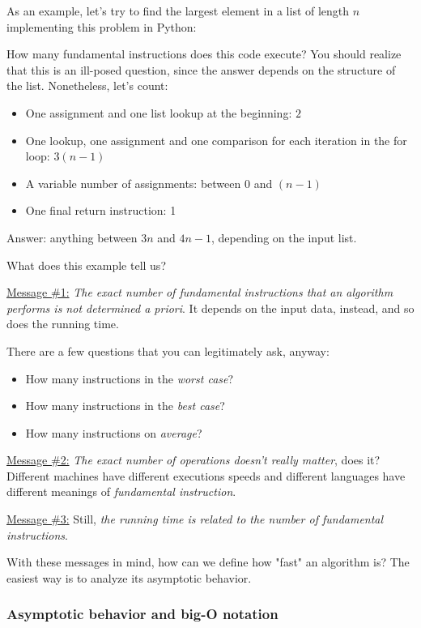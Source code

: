 As an example, let's try to find the largest element in a list of length $n$ implementing this problem in Python:



How many fundamental instructions does this code execute? You should realize that this is an ill-posed question, since the answer depends on the structure of the list. Nonetheless, let's count:
\begin{itemize}
    \item[-] One assignment and one list lookup at the beginning: $2$
    \item[-] One lookup, one assignment and one comparison for each iteration in the for loop: $3(n - 1)$
    \item[-] A variable number of assignments: between $0$ and $(n - 1)$
    \item[-] One final return instruction: 1
\end{itemize}
Answer: anything between $3n$ and $4n - 1$, depending on the input list.

What does this example tell us?

\underline{Message \#1:} \textit{The exact number of fundamental instructions that an algorithm performs is not determined a priori}. It depends on the input data, instead, and so does the running time.

There are a few questions that you can legitimately ask, anyway:
\begin{itemize}
    \item[-] How many instructions in the \textit{worst case}?
    \item[-] How many instructions in the \textit{best case}?
    \item[-] How many instructions on \textit{average}?
\end{itemize}

\underline{Message \#2:} \textit{The exact number of operations doesn't really matter}, does it? Different machines have different executions speeds and different languages have different meanings of \textit{fundamental instruction}.

\underline{Message \#3:} Still, \textit{the running time is related to the number of fundamental instructions}.

With these messages in mind, how can we define how "fast" an algorithm is? The easiest way is to analyze its asymptotic behavior.

\subsubsection{Asymptotic behavior and big-O notation}


